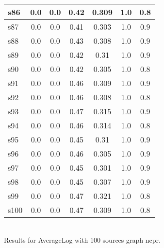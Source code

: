 \documentclass{article}
\begin{document}
\begin{tabular}{|l|c|c|c|c|c|c|}
\hline
s86 &0.0 & 0.0 & 0.42 & 0.309 & 1.0 & 0.8\\
\hline
s87 &0.0 & 0.0 & 0.41 & 0.303 & 1.0 & 0.9\\
\hline
s88 &0.0 & 0.0 & 0.43 & 0.308 & 1.0 & 0.9\\
\hline
s89 &0.0 & 0.0 & 0.42 & 0.31 & 1.0 & 0.9\\
\hline
s90 &0.0 & 0.0 & 0.42 & 0.305 & 1.0 & 0.8\\
\hline
s91 &0.0 & 0.0 & 0.46 & 0.309 & 1.0 & 0.9\\
\hline
s92 &0.0 & 0.0 & 0.46 & 0.308 & 1.0 & 0.8\\
\hline
s93 &0.0 & 0.0 & 0.47 & 0.315 & 1.0 & 0.9\\
\hline
s94 &0.0 & 0.0 & 0.46 & 0.314 & 1.0 & 0.8\\
\hline
s95 &0.0 & 0.0 & 0.45 & 0.31 & 1.0 & 0.9\\
\hline
s96 &0.0 & 0.0 & 0.46 & 0.305 & 1.0 & 0.9\\
\hline
s97 &0.0 & 0.0 & 0.45 & 0.301 & 1.0 & 0.9\\
\hline
s98 &0.0 & 0.0 & 0.45 & 0.307 & 1.0 & 0.9\\
\hline
s99 &0.0 & 0.0 & 0.47 & 0.321 & 1.0 & 0.8\\
\hline
s100 &0.0 & 0.0 & 0.47 & 0.309 & 1.0 & 0.8\\
\hline
\end{tabular}\\

\noindent Results for AverageLog with 100 sources graph ncpr.
\end{document}
